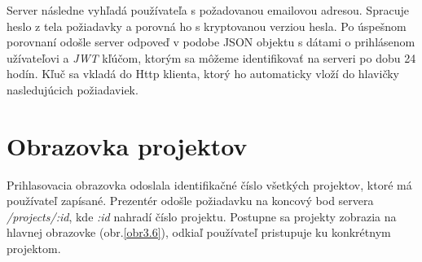 Server následne vyhľadá používateľa s požadovanou emailovou adresou. Spracuje heslo z tela požiadavky a porovná ho s kryptovanou verziou hesla. Po úspešnom porovnaní odošle server odpoveď v podobe JSON objektu s dátami o prihlásenom užívateľovi a \textit{JWT} kľúčom, ktorým sa môžeme identifikovať na serveri po dobu 24 hodín. Kľuč sa vkladá do Http klienta, ktorý ho automaticky vloží do hlavičky nasledujúcich požiadaviek.

\section{Obrazovka projektov}
Prihlasovacia obrazovka odoslala identifikačné číslo všetkých projektov, ktoré má používateľ zapísané. Prezentér odošle požiadavku na koncový bod servera \textit{/projects/:id}, kde \textit{:id} nahradí číslo projektu. Postupne sa projekty zobrazia na hlavnej obrazovke (obr.\ref{obr3.6}), odkiaľ používateľ pristupuje ku konkrétnym projektom.

